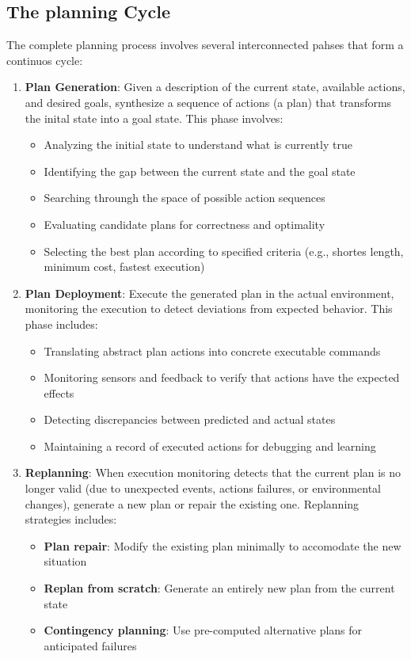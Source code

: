 \documentclass[a4paper]{article}
\theoremstyle{definition}
\begin{document}
\subsection{The planning Cycle}
The complete planning process involves several interconnected pahses that form a continuos cycle:
\begin{enumerate}
    \item \textbf{Plan Generation}: Given a description of the current state, available actions, and desired
            goals, synthesize a sequence of actions (a plan) that transforms the inital state into a goal state.
            This phase involves:
            \begin{itemize}
                \item Analyzing the initial state to understand what is currently true 
                \item Identifying the gap between the current state and the goal state
                \item Searching throungh the space of possible action sequences 
                \item Evaluating candidate plans for correctness and optimality 
                \item Selecting the best plan according to specified criteria (e.g., shortes length, minimum cost, fastest execution)
            \end{itemize}
    \item \textbf{Plan Deployment}: Execute the generated plan in the actual environment, monitoring the execution
            to detect deviations from expected behavior. This phase includes:
            \begin{itemize}
                \item Translating abstract plan actions into concrete executable commands 
                \item Monitoring sensors and feedback to verify that actions have the expected effects
                \item Detecting discrepancies between predicted and actual states
                \item Maintaining a record of executed actions for debugging and learning
            \end{itemize}
    \item \textbf{Replanning}: When execution monitoring detects that the current plan is no longer valid
            (due to unexpected events, actions failures, or environmental changes), generate a new plan
            or repair the existing one. Replanning strategies includes:
            \begin{itemize}
                \item \textbf{Plan repair}: Modify the existing plan minimally to accomodate the new situation 
                \item \textbf{Replan from scratch}: Generate an entirely new plan from the current state
                \item \textbf{Contingency planning}: Use pre-computed alternative plans for anticipated failures
            \end{itemize}
\end{enumerate}
\end{document}
